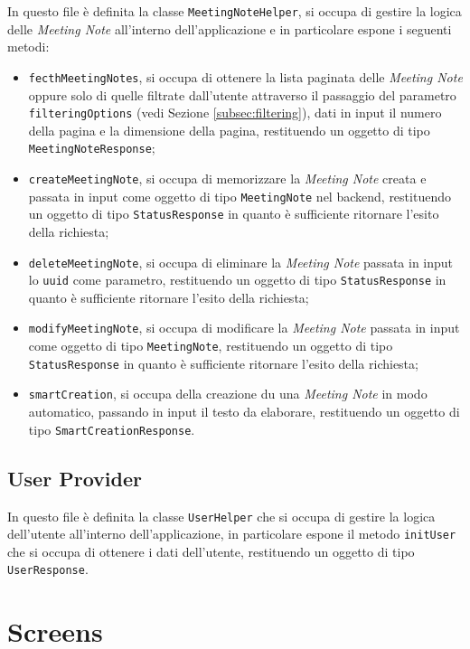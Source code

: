 In questo file è definita la classe \lstinline{MeetingNoteHelper}, si occupa di gestire la logica delle \emph{Meeting Note} all'interno dell'applicazione e in particolare espone i seguenti metodi:
\begin{itemize}
    \item \lstinline{fecthMeetingNotes}, si occupa di ottenere la lista paginata delle \emph{Meeting Note} oppure solo di quelle filtrate dall'utente attraverso il passaggio del parametro \lstinline{filteringOptions} (vedi Sezione \ref{subsec:filtering}), dati in input il numero della pagina e la dimensione della pagina, restituendo un oggetto di tipo \lstinline{MeetingNoteResponse};
    \item \lstinline{createMeetingNote}, si occupa di memorizzare la \emph{Meeting Note} creata e passata in input come oggetto di tipo \lstinline{MeetingNote} nel \gls{backend}\glsoccur, restituendo un oggetto di tipo \lstinline{StatusResponse} in quanto è sufficiente ritornare l'esito della richiesta;
    \item \lstinline{deleteMeetingNote}, si occupa di eliminare la \emph{Meeting Note} passata in input lo \lstinline{uuid} come parametro, restituendo un oggetto di tipo \lstinline{StatusResponse} in quanto è sufficiente ritornare l'esito della richiesta;
    \item \lstinline{modifyMeetingNote}, si occupa di modificare la \emph{Meeting Note} passata in input come oggetto di tipo \lstinline{MeetingNote}, restituendo un oggetto di tipo \lstinline{StatusResponse} in quanto è sufficiente ritornare l'esito della richiesta;
    \item \lstinline{smartCreation}, si occupa della creazione du una \emph{Meeting Note} in modo automatico, passando in input il testo da elaborare, restituendo un oggetto di tipo \lstinline{SmartCreationResponse}.
\end{itemize}

\subsection{User Provider}
\label{subsec:user-provider}

In questo file è definita la classe \lstinline{UserHelper} che si occupa di gestire la logica dell'utente all'interno dell'applicazione, in particolare espone il metodo \lstinline{initUser} che si occupa di ottenere i dati dell'utente, restituendo un oggetto di tipo \lstinline{UserResponse}.

\section{Screens}
\label{sec:screens}

